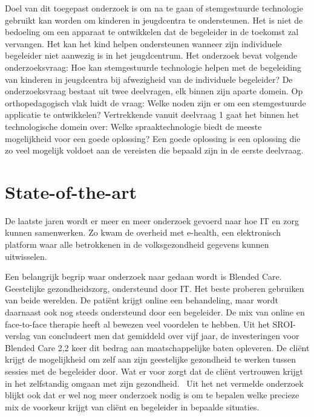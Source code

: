 Doel van dit toegepast onderzoek is om na te gaan of stemgestuurde technologie gebruikt kan worden om kinderen in jeugdcentra te ondersteunen. Het is niet de bedoeling om een apparaat te ontwikkelen dat de begeleider in de toekomst zal vervangen. Het kan het kind helpen ondersteunen wanneer zijn individuele begeleider niet aanwezig is in het jeugdcentrum.
Het onderzoek bevat volgende onderzoeksvraag: Hoe kan stemgestuurde technologie helpen met de begeleiding van kinderen in jeugdcentra bij afwezigheid van de individuele begeleider? 
De onderzoeksvraag bestaat uit twee deelvragen, elk binnen zijn aparte domein. Op orthopedagogisch vlak luidt de vraag: Welke noden zijn er om een stemgestuurde applicatie te ontwikkelen? Vertrekkende vanuit deelvraag 1 gaat het binnen het technologische domein over: Welke spraaktechnologie biedt de meeste mogelijkheid voor een goede oplossing? Een goede oplossing is een oplossing die zo veel mogelijk voldoet aan de vereisten die bepaald zijn in de eerste deelvraag. 


\section{State-of-the-art}
\label{sec:state-of-the-art}

De laatste jaren wordt er meer en meer onderzoek gevoerd naar hoe IT en zorg kunnen samenwerken. Zo kwam de overheid met e-health, een elektronisch platform waar alle betrokkenen in de volksgezondheid gegevens kunnen uitwisselen.\autocite{Datanews2012}

Een belangrijk begrip waar onderzoek naar gedaan wordt is Blended Care. Geestelijke gezondheidszorg, ondersteund door IT. Het beste proberen gebruiken van beide werelden. De patiënt krijgt online een behandeling, maar wordt daarnaast ook nog steeds ondersteund door een begeleider. De mix van online en face-to-face therapie heeft al bewezen veel voordelen te hebben. Uit het SROI-verslag van \autocite{Stil2016} concludeert men dat gemiddeld over vijf jaar, de investeringen voor Blended Care 2,2 keer dit bedrag aan maatschappelijke baten opleveren. De cliënt krijgt de mogelijkheid om zelf aan zijn geestelijke gezondheid te werken tussen sessies met de begeleider door. Wat er voor zorgt dat de cliënt vertrouwen krijgt in het zelfstandig omgaan met zijn gezondheid.~\autocite{Wentzel2016} Uit het net vermelde onderzoek blijkt ook dat er wel nog meer onderzoek nodig is om te bepalen welke precieze mix de voorkeur krijgt van cliënt en begeleider in bepaalde situaties.

